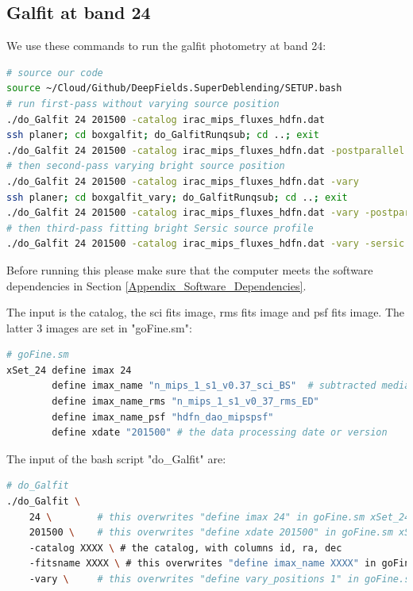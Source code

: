 \documentclass[11pt,a4paper]{article}
\begin{document}
\subsection{Galfit at band 24}

We use these commands to run the galfit photometry at band 24:

\begin{lstlisting}[language=bash]
# source our code
source ~/Cloud/Github/DeepFields.SuperDeblending/SETUP.bash
# run first-pass without varying source position
./do_Galfit 24 201500 -catalog irac_mips_fluxes_hdfn.dat
ssh planer; cd boxgalfit; do_GalfitRunqsub; cd ..; exit
./do_Galfit 24 201500 -catalog irac_mips_fluxes_hdfn.dat -postparallel
# then second-pass varying bright source position
./do_Galfit 24 201500 -catalog irac_mips_fluxes_hdfn.dat -vary
ssh planer; cd boxgalfit_vary; do_GalfitRunqsub; cd ..; exit
./do_Galfit 24 201500 -catalog irac_mips_fluxes_hdfn.dat -vary -postparallel
# then third-pass fitting bright Sersic source profile
./do_Galfit 24 201500 -catalog irac_mips_fluxes_hdfn.dat -vary -sersic
\end{lstlisting}

Before running this please make sure that the computer meets the software dependencies in Section \ref{Appendix_Software_Dependencies}. 

The input is the catalog, the sci fits image, rms fits image and psf fits image. The latter 3 images are set in "goFine.sm": 

\begin{lstlisting}[language=bash]
# goFine.sm
xSet_24	define imax 24
		define imax_name "n_mips_1_s1_v0.37_sci_BS"  # subtracted median smooth back
		define imax_name_rms "n_mips_1_s1_v0_37_rms_ED"
		define imax_name_psf "hdfn_dao_mipspsf"
		define xdate "201500" # the data processing date or version
\end{lstlisting}

The input of the bash script "do\_Galfit" are: 

\begin{lstlisting}[language=bash]
# do_Galfit
./do_Galfit \
	24 \ 		# this overwrites "define imax 24" in goFine.sm xSet_24
	201500 \ 	# this overwrites "define xdate 201500" in goFine.sm xSet_24
	-catalog XXXX \ # the catalog, with columns id, ra, dec
	-fitsname XXXX \ # this overwrites "define imax_name XXXX" in goFine.sm xSet_24
	-vary \ 	# this overwrites "define vary_positions 1" in goFine.sm xSet_24
\end{lstlisting}
\end{document}
